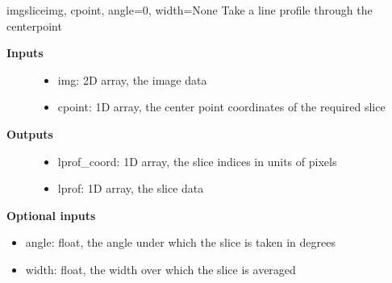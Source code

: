 \documentclass[letterpaper,10pt,english]{manual}
\begin{document}
\hypertarget{odysseus.imageprocess.imgslice}{}\begin{funcdesc}{imgslice}{img, cpoint, angle=0, width=None}
Take a line profile through the centerpoint
\begin{description}
\item[\textbf{Inputs}] \leavevmode\begin{itemize}
\item {} 
img: 2D array, the image data

\item {} 
cpoint: 1D array, the center point coordinates of the required slice

\end{itemize}

\item[\textbf{Outputs}] \leavevmode\begin{itemize}
\item {} 
lprof\_coord: 1D array, the slice indices in units of pixels

\item {} 
lprof: 1D array, the slice data

\end{itemize}

\end{description}

\textbf{Optional inputs}
\begin{itemize}
\item {} 
angle: float, the angle under which the slice is taken in degrees

\item {} 
width: float, the width over which the slice is averaged

\end{itemize}
\end{funcdesc}
\end{document}
